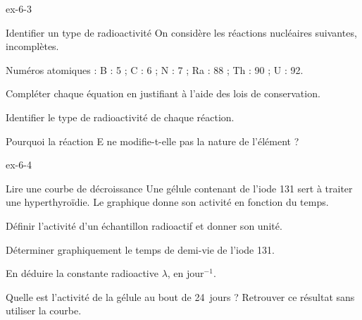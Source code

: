 \begin{blocLivre}{ex-6-3}
\begin{exercice}[1]{Identifier un type de radioactivité}
On considère les réactions nucléaires suivantes, incomplètes.
\begin{questions}[label=\otLabel{\Alph*.},leftmargin=1.9em,itemsep=0pt,parsep=0.15em]
\item {}
\item {}
\item {}
\item {}
\item {}
\end{questions}
\begin{donnees}
Numéros atomiques : B : 5 ; C : 6 ; N : 7 ; Ra : 88 ; Th : 90 ; U : 92.
\end{donnees}
\begin{questions}
\item Compléter chaque équation en justifiant à l'aide des lois de conservation.
\item Identifier le type de radioactivité de chaque réaction.
\item Pourquoi la réaction E ne modifie-t-elle pas la nature de l'élément ?
\end{questions}
\end{exercice}
\end{blocLivre}
\begin{blocLivre}{ex-6-4}
\begin{exercice}[1]{Lire une courbe de décroissance}
Une gélule contenant de l'iode 131 sert à traiter une hyperthyroïdie. Le graphique donne son activité en fonction du temps.
\begin{questions}
\item Définir l'activité d'un échantillon radioactif et donner son unité.
\item Déterminer graphiquement le temps de demi-vie de l'iode 131.
\item En déduire la constante radioactive $\lambda$, en jour$^{-1}$.
\item Quelle est l'activité de la gélule au bout de 24~jours ? Retrouver ce résultat sans utiliser la courbe.
\end{questions}
\end{exercice}
\end{blocLivre}

